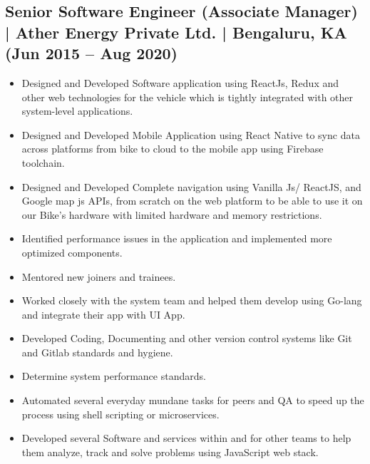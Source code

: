 \documentclass[10pt,a4paper]{article}
\begin{document}
\subsection*{Senior Software Engineer (Associate Manager) | Ather Energy Private Ltd. | Bengaluru, KA (Jun 2015 -- Aug 2020)}
\begin{itemize}[leftmargin=*]
  \item Designed and Developed Software application using ReactJs, Redux and other web technologies for the vehicle which is tightly integrated with other system-level applications.
  \item Designed and Developed Mobile Application using React Native to sync data across platforms from bike to cloud to the mobile app using Firebase toolchain.
  \item Designed and Developed Complete navigation using Vanilla Js/ ReactJS, and Google map js APIs, from scratch on the web platform to be able to use it on our Bike's hardware with limited hardware and memory restrictions.
  \item Identified performance issues in the application and implemented more optimized components.
  \item Mentored new joiners and trainees.
  \item Worked closely with the system team and helped them develop using Go-lang and integrate their app with UI App.
  \item Developed Coding, Documenting and other version control systems like Git and Gitlab standards and hygiene.
  \item Determine system performance standards.
  \item Automated several everyday mundane tasks for peers and QA to speed up the process using shell scripting or microservices.
  \item Developed several Software and services within and for other teams to help them analyze, track and solve problems using JavaScript web stack.
\end{itemize}
\end{document}
